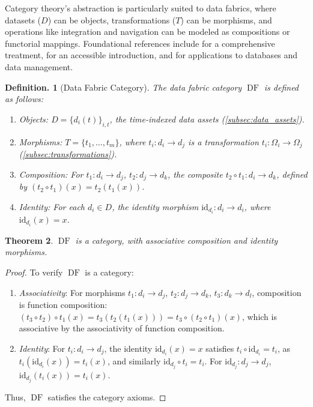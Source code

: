 \documentclass{amsart}
\newtheorem{thm}{Theorem}
\newtheorem{defn}[thm]{Definition.}
\DeclareMathOperator\DF{DF}
\begin{document}
Category theory’s abstraction is particularly suited to data fabrics, where datasets (\( D \)) can be objects, transformations (\( T \)) can be morphisms, and operations like integration and navigation can be modeled as compositions or functorial mappings. Foundational references include \cite{MacLane1971} for a comprehensive treatment, \cite{Awodey2010} for an accessible introduction, and \cite{Spivak2014} for applications to databases and data management.


\begin{defn}[Data Fabric Category]
\label{subsec:df_category}
The \emph{data fabric category} \( \DF \) is defined as follows:

\begin{enumerate}
    \item \emph{Objects}: \( D = \{d_i(t)\}_{i,t} \), the time-indexed data assets (\cref{subsec:data_assets}).
  
    \item \emph{Morphisms}: \( T = \{t_1, \dots, t_m\} \), where \( t_i: d_i \to d_j \) is a transformation \( t_i: \Omega_i \to \Omega_j \) (\cref{subsec:transformations}).

    \item \emph{Composition}: For \( t_1: d_i \to d_j \), \( t_2: d_j \to d_k \), the composite \( t_2 \circ t_1: d_i \to d_k \), defined by \( (t_2 \circ t_1)(x) = t_2(t_1(x)) \).
  
    \item \emph{Identity}: For each \( d_i \in D \), the identity morphism \( \text{id}_{d_i}: d_i \to d_i \), where \( \text{id}_{d_i}(x) = x \).
\end{enumerate}
\end{defn}

\begin{thm}
\( \DF \) is a category, with associative composition and identity morphisms.
\end{thm}

\begin{proof}
To verify \( \DF \) is a category:
\begin{enumerate}
    \item \emph{Associativity}: For morphisms \( t_1: d_i \to d_j \), \( t_2: d_j \to d_k \), \( t_3: d_k \to d_l \), composition is function composition: \( (t_3 \circ t_2) \circ t_1(x) = t_3(t_2(t_1(x))) = t_3 \circ (t_2 \circ t_1)(x) \), which is associative by the associativity of function composition.
    \item \emph{Identity}: For \( t_i: d_i \to d_j \), the identity \( \text{id}_{d_i}(x) = x \) satisfies \( t_i \circ \text{id}_{d_i} = t_i \), as \( t_i(\text{id}_{d_i}(x)) = t_i(x) \), and similarly \( \text{id}_{d_j} \circ t_i = t_i \). For \( \text{id}_{d_j}: d_j \to d_j \), \( \text{id}_{d_j}(t_i(x)) = t_i(x) \).
\end{enumerate}
Thus, \( \DF \) satisfies the category axioms.
\end{proof}
\end{document}
